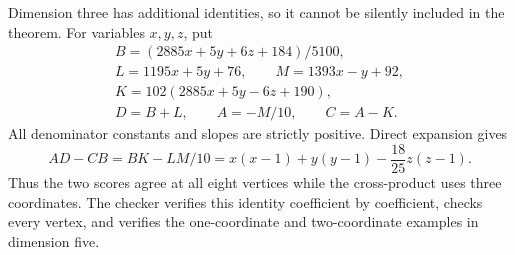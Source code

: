 \documentclass[11pt]{article}
\begin{document}
Dimension three has additional identities, so it cannot be silently
included in the theorem. For variables $x,y,z$, put
\[
 \begin{gathered}
 B=(2885x+5y+6z+184)/5100,\\
 L=1195x+5y+76,\qquad M=1393x-y+92,\\
 K=102(2885x+5y-6z+190),\\
 D=B+L,\qquad A=-M/10,\qquad C=A-K.
 \end{gathered}
\]
All denominator constants and slopes are strictly positive. Direct
expansion gives
\[
 AD-CB=BK-LM/10
      =x(x-1)+y(y-1)-\frac{18}{25}z(z-1).
\]
Thus the two scores agree at all eight vertices while the cross-product
uses three coordinates. The checker verifies this identity coefficient
by coefficient, checks every vertex, and verifies the one-coordinate
and two-coordinate examples in dimension five.
\end{document}
